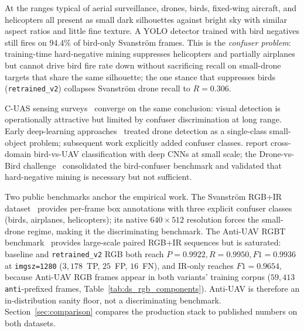 At the ranges typical of aerial surveillance, drones, birds, fixed-wing aircraft, and helicopters all present as small dark silhouettes against bright sky with similar aspect ratios and little fine texture. A YOLO detector trained with bird negatives still fires on 94.4\% of bird-only Svanstr\"om frames. This is the \emph{confuser problem}: training-time hard-negative mining suppresses helicopters and partially airplanes but cannot drive bird fire rate down without sacrificing recall on small-drone targets that share the same silhouette; the one stance that suppresses birds (\texttt{retrained\_v2}) collapses Svanstr\"om drone recall to $R=0.306$.

C-UAS sensing surveys~\cite{shi2018counteruas,taha2019drone,samaras2019deep} converge on the same conclusion: visual detection is operationally attractive but limited by confuser discrimination at long range. Early deep-learning approaches~\cite{aker2017using,rozantsev2017detecting} treated drone detection as a single-class small-object problem; subsequent work explicitly added confuser classes. \citet{schumann2017deep} report cross-domain bird-vs-UAV classification with deep CNNs at small scale; the Drone-vs-Bird challenge~\cite{coluccia2021dronevsbird} consolidated the bird-confuser benchmark and validated that hard-negative mining is necessary but not sufficient.

Two public benchmarks anchor the empirical work. The Svanstr\"om RGB+IR dataset~\cite{svanstrom2021real,svanstrom2022dronedataset} provides per-frame box annotations with three explicit confuser classes (birds, airplanes, helicopters); its native $640\times512$ resolution forces the small-drone regime, making it the discriminating benchmark. The Anti-UAV RGBT benchmark~\cite{jiang2021antiuav,zhao2023antiuav} provides large-scale paired RGB+IR sequences but is saturated: baseline and \texttt{retrained\_v2} RGB both reach $P=0.9922, R=0.9950, F1=0.9936$ at \texttt{imgsz=1280} ($3{,}178$~TP, $25$~FP, $16$~FN), and IR-only reaches $F1=0.9654$, because Anti-UAV RGB frames appear in both variants' training corpus ($59{,}413$ \texttt{anti}-prefixed frames, Table~\ref{tab:ds_rgb_components}). Anti-UAV is therefore an in-distribution sanity floor, not a discriminating benchmark. Section~\ref{sec:comparison} compares the production stack to published numbers on both datasets.

